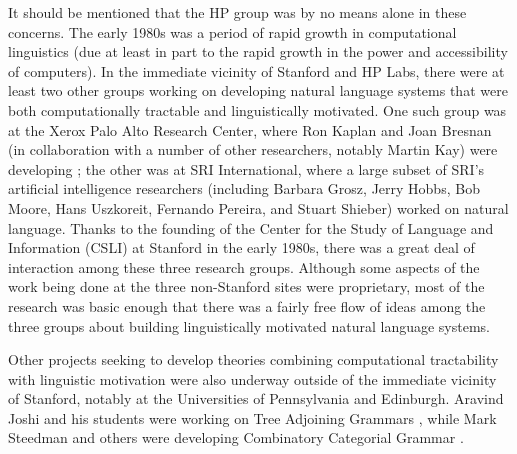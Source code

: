 \documentclass[output=paper
                ,modfonts
                ,nonflat
	        ,collection
	        ,collectionchapter
	        ,collectiontoclongg
 	        ,biblatex
                ,babelshorthands
                ,newtxmath
                ,draftmode
                ,colorlinks, citecolor=brown
]{./langsci/langscibook}
\begin{document}
It should be mentioned that the HP group was by no means alone in these concerns.  The early 1980s was a period of rapid growth in computational linguistics (due at least in part to the rapid growth in the power and accessibility of computers).  In the immediate vicinity of Stanford and HP Labs, there were at least two other groups working on developing natural language systems that were both computationally tractable and linguistically motivated.  One such group was at the Xerox Palo Alto Research Center, where Ron Kaplan and Joan Bresnan (in collaboration with a number of other researchers, notably Martin Kay) were developing ; the other was at SRI International, where a large subset of SRI's artificial intelligence researchers  (including Barbara Grosz, Jerry Hobbs, Bob Moore, Hans Uszkoreit, Fernando Pereira, and Stuart Shieber) worked on natural language.  Thanks to the founding of the Center for the Study of Language and Information (CSLI) at Stanford in the early 1980s, there was a great deal of interaction among these three research groups.  Although some aspects of the work being done at the three non-Stanford sites were proprietary, most of the research was basic enough that there was a fairly free flow of ideas among the three groups about building linguistically motivated natural language systems.

Other projects seeking to develop theories combining computational tractability with linguistic motivation were also underway outside of the immediate vicinity of Stanford, notably at the Universities of Pennsylvania and Edinburgh.  Aravind Joshi and his students were working on Tree Adjoining Grammars \citep{JLT75a-u,Joshi87a-u}, while Mark Steedman and others were developing Combinatory Categorial Grammar \citep{Steedman87a-u,Steedman90a-u}.
\end{document}
